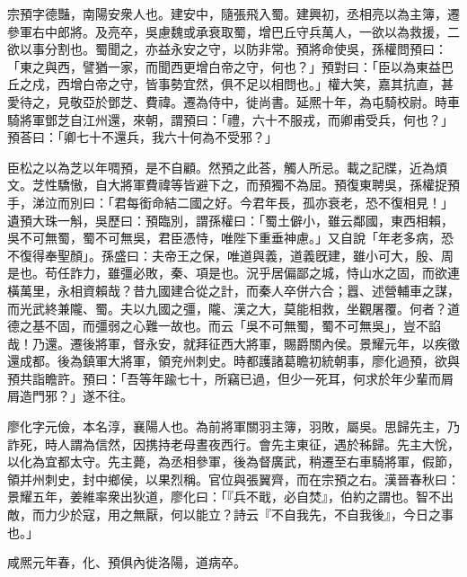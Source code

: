 
\begin{pinyinscope}
宗預字德豔，南陽安衆人也。建安中，隨張飛入蜀。建興初，丞相亮以為主簿，遷參軍右中郎將。及亮卒，吳慮魏或承衰取蜀，增巴丘守兵萬人，一欲以為救援，二欲以事分割也。蜀聞之，亦益永安之守，以防非常。預將命使吳，孫權問預曰：「東之與西，譬猶一家，而聞西更增白帝之守，何也？」預對曰：「臣以為東益巴丘之戍，西增白帝之守，皆事勢宜然，俱不足以相問也。」權大笑，嘉其抗直，甚愛待之，見敬亞於鄧芝、費禕。遷為侍中，徙尚書。延熈十年，為屯騎校尉。時車騎將軍鄧芝自江州還，來朝，謂預曰：「禮，六十不服戎，而卿甫受兵，何也？」預荅曰：「卿七十不還兵，我六十何為不受邪？」

臣松之以為芝以年啁預，是不自顧。然預之此荅，觸人所忌。載之記牒，近為煩文。芝性驕慠，自大將軍費禕等皆避下之，而預獨不為屈。預復東聘吳，孫權捉預手，涕泣而別曰：「君每銜命結二國之好。今君年長，孤亦衰老，恐不復相見！」遺預大珠一斛，吳歷曰：預臨別，謂孫權曰：「蜀土僻小，雖云鄰國，東西相賴，吳不可無蜀，蜀不可無吳，君臣憑恃，唯陛下重垂神慮。」又自說「年老多病，恐不復得奉聖顏」。孫盛曰：夫帝王之保，唯道與義，道義旣建，雖小可大，殷、周是也。苟任詐力，雖彊必敗，秦、項是也。況乎居偏鄙之城，恃山水之固，而欲連橫萬里，永相資賴哉？昔九國建合從之計，而秦人卒併六合；囂、述營輔車之謀，而光武終兼隴、蜀。夫以九國之彊，隴、漢之大，莫能相救，坐觀屠覆。何者？道德之基不固，而彊弱之心難一故也。而云「吳不可無蜀，蜀不可無吳」，豈不諂哉！乃還。遷後將軍，督永安，就拜征西大將軍，賜爵關內侯。景耀元年，以疾徵還成都。後為鎮軍大將軍，領兖州刺史。時都護諸葛瞻初統朝事，廖化過預，欲與預共詣瞻許。預曰：「吾等年踰七十，所竊已過，但少一死耳，何求於年少輩而屑屑造門邪？」遂不往。

廖化字元儉，本名淳，襄陽人也。為前將軍關羽主簿，羽敗，屬吳。思歸先主，乃詐死，時人謂為信然，因携持老母晝夜西行。會先主東征，遇於秭歸。先主大恱，以化為宜都太守。先主薨，為丞相參軍，後為督廣武，稍遷至右車騎將軍，假節，領并州刺史，封中鄉侯，以果烈稱。官位與張翼齊，而在宗預之右。漢晉春秋曰：景耀五年，姜維率衆出狄道，廖化曰：「『兵不戢，必自焚』，伯約之謂也。智不出敵，而力少於寇，用之無厭，何以能立？詩云『不自我先，不自我後』，今日之事也。」

咸熈元年春，化、預俱內徙洛陽，道病卒。


\end{pinyinscope}